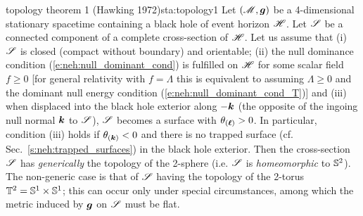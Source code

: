 \begin{tprop}{topology theorem 1 \textnormal{(Hawking 1972)}}{sta:topology1}
Let $(\mathscr{M}, \bm{g})$ be a 4-dimensional stationary spacetime
containing a black hole of event horizon $\mathscr{H}$.
Let $\mathscr{S}$ be a connected component of a complete cross-section of $\mathscr{H}$.
Let us assume that (i) $\mathscr{S}$ is closed (compact without boundary) and orientable;
(ii) the null dominance condition (\ref{e:neh:null_dominant_cond})
is fulfilled on $\mathscr{H}$ for some scalar field $f \geq 0$
[for general relativity with $f=\Lambda$
this is equivalent to assuming $\Lambda \geq 0$ and
the dominant null energy condition (\ref{e:neh:null_dominant_cond_T})]
and (iii) when
displaced into the black hole exterior along $-\bm{k}$ (the opposite of
the ingoing null normal $\bm{k}$ to $\mathscr{S}$),
$\mathscr{S}$ becomes a surface with $\theta_{(\bm{\ell})} > 0$.
In particular, condition (iii) holds if $\theta_{(\bm{k})} < 0$ and there is no trapped
surface (cf. Sec.~\ref{s:neh:trapped_surfaces}) in the black hole exterior.
Then the cross-section $\mathscr{S}$
has \emph{generically} the topology of the 2-sphere (i.e. $\mathscr{S}$ is
\emph{homeomorphic} to $\mathbb{S}^2$). The non-generic case
is that of $\mathscr{S}$ having the topology of the 2-torus $\mathbb{T}^2 = \mathbb{S}^1\times\mathbb{S}^1$; this can occur only under special circumstances,
among which the metric induced by $\bm{g}$ on $\mathscr{S}$ must be flat.
\end{tprop}


